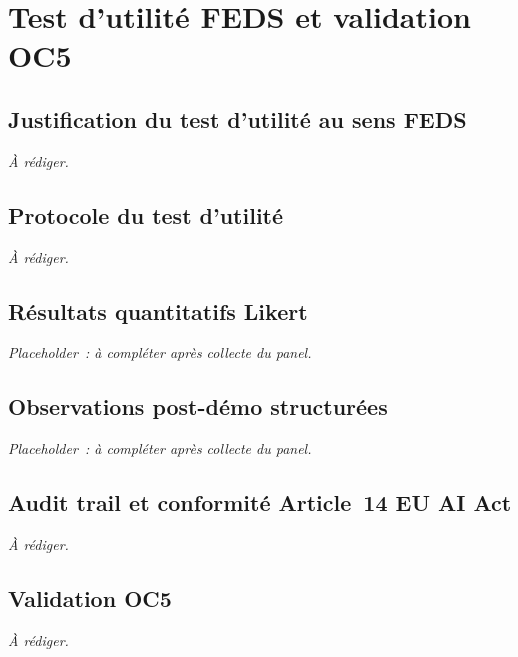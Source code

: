 \chapter{Test d'utilit\'e FEDS et validation OC5}\label{chap:experts}


\section{Justification du test d'utilit\'e au sens FEDS}\label{sec:experts-justif}

\textit{\`A r\'ediger.}

\section{Protocole du test d'utilit\'e}\label{sec:experts-protocole}

\textit{\`A r\'ediger.}

\section{R\'esultats quantitatifs Likert}\label{sec:experts-likert}

\textit{Placeholder~: \`a compl\'eter apr\`es collecte du panel.}

\section{Observations post-d\'emo structur\'ees}\label{sec:experts-observations}

\textit{Placeholder~: \`a compl\'eter apr\`es collecte du panel.}

\section{Audit trail et conformit\'e Article~14 EU AI Act}\label{sec:experts-audit}

\textit{\`A r\'ediger.}

\section{Validation OC5}\label{sec:experts-validation}

\textit{\`A r\'ediger.}
